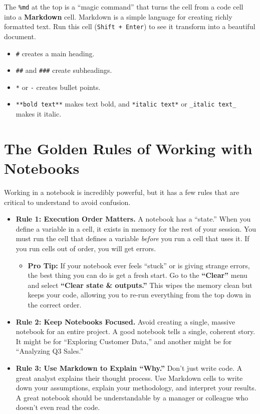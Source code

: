 \documentclass[
  letterpaper,
  DIV=11,
  numbers=noendperiod]{scrreprt}
\providecommand{\tightlist}{%
  \setlength{\itemsep}{0pt}\setlength{\parskip}{0pt}}
\begin{document}
The \texttt{\%md} at the top is a ``magic command'' that turns the cell
from a code cell into a \textbf{Markdown} cell. Markdown is a simple
language for creating richly formatted text. Run this cell
(\texttt{Shift\ +\ Enter}) to see it transform into a beautiful
document.

\begin{itemize}
\tightlist
\item
  \texttt{\#} creates a main heading.
\item
  \texttt{\#\#} and \texttt{\#\#\#} create subheadings.
\item
  \texttt{*} or \texttt{-} creates bullet points.
\item
  \texttt{**bold\ text**} makes text bold, and \texttt{*italic\ text*}
  or \texttt{\_italic\ text\_} makes it italic.
\end{itemize}

\section*{The Golden Rules of Working with
Notebooks}\label{the-golden-rules-of-working-with-notebooks}


Working in a notebook is incredibly powerful, but it has a few rules
that are critical to understand to avoid confusion.

\begin{itemize}
\item
  \textbf{Rule 1: Execution Order Matters.} A notebook has a ``state.''
  When you define a variable in a cell, it exists in memory for the rest
  of your session. You must run the cell that defines a variable
  \emph{before} you run a cell that uses it. If you run cells out of
  order, you will get errors.

  \begin{itemize}
  \tightlist
  \item
    \textbf{Pro Tip:} If your notebook ever feels ``stuck'' or is giving
    strange errors, the best thing you can do is get a fresh start. Go
    to the \textbf{``Clear''} menu and select \textbf{``Clear state \&
    outputs.''} This wipes the memory clean but keeps your code,
    allowing you to re-run everything from the top down in the correct
    order.
  \end{itemize}
\item
  \textbf{Rule 2: Keep Notebooks Focused.} Avoid creating a single,
  massive notebook for an entire project. A good notebook tells a
  single, coherent story. It might be for ``Exploring Customer Data,''
  and another might be for ``Analyzing Q3 Sales.''
\item
  \textbf{Rule 3: Use Markdown to Explain ``Why.''} Don't just write
  code. A great analyst explains their thought process. Use Markdown
  cells to write down your assumptions, explain your methodology, and
  interpret your results. A great notebook should be understandable by a
  manager or colleague who doesn't even read the code.
\end{itemize}
\end{document}
